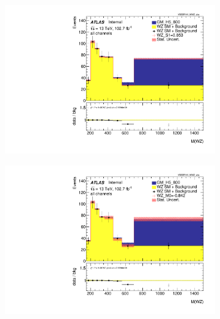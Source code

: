 \documentclass[../Bachelorarbeit.tex]{subfiles}
\begin{document}
\begin{figure}[h]

    \centering
    \begin{subfigure}{0.3\textwidth}
        \includegraphics[width=\textwidth]{Plots/ALL_MWZ_final/GM_H5_800/S1/2022-05-07/VBSSR/all_VV_MWZ_vbs.pdf}
    \end{subfigure}
    \begin{subfigure}{0.3\textwidth}
        \includegraphics[width=\textwidth]{Plots/ALL_MWZ_final/GM_H5_800/M0/2022-05-07/VBSSR/all_VV_MWZ_vbs.pdf}
    \end{subfigure}
    \begin{subfigure}{0.3\textwidth}

\end{subfigure}
\end{figure}
\end{document}
